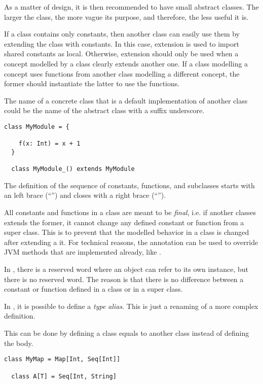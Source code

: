 As a matter of design, it is then recommended to have small abstract classes.
The larger the class, the more vague its purpose, and therefore, the less useful it is.

If a class contains only constants, then another class can easily use them by extending the class with constants.
In this case, extension is used to import shared constants as local.
Otherwise, extension should only be used when a concept modelled by a class clearly extends another one.
If a class modelling a concept uses functions from another class modelling a different concept, the former should instantiate the latter to use the functions.

The name of a concrete class that is a default implementation of another class could be the name of the abstract class with a suffix underscore.

\begin{lstlisting}[label={lst:exampleDefaultImplementation}]
  class MyModule = {

    f(x: Int) = x + 1
  }

  class MyModule_() extends MyModule
\end{lstlisting}

The definition of the sequence of constants, functions, and subclasses starts with an left brace (``\srccode{\{}'') and closes with a right brace (``\srccode{\}}'').

All constants and functions in a class are meant to be \textit{final}, i.e. if another classes extends the former, it cannot change any defined constant or function from a super class.
This is to prevent that the modelled behavior in a class is changed after extending a it.
For technical reasons, the annotation \soverride can be used to override JVM methods that are implemented already, like .

In \Soda, there is a \sthis reserved word where an object can refer to its own instance, but there is no \scalasuper reserved word.
The reason is that there is no difference between a constant or function defined in a class or in a super class.

In \Soda, it is possible to define a \textit{type alias}.
This is just a renaming of a more complex definition.

This can be done by defining a class equals to another class instead of defining the body.

\begin{lstlisting}[label={lst:exampleTypeAlias}]
  class MyMap = Map[Int, Seq[Int]]

  class A[T] = Seq[Int, String]
\end{lstlisting}

